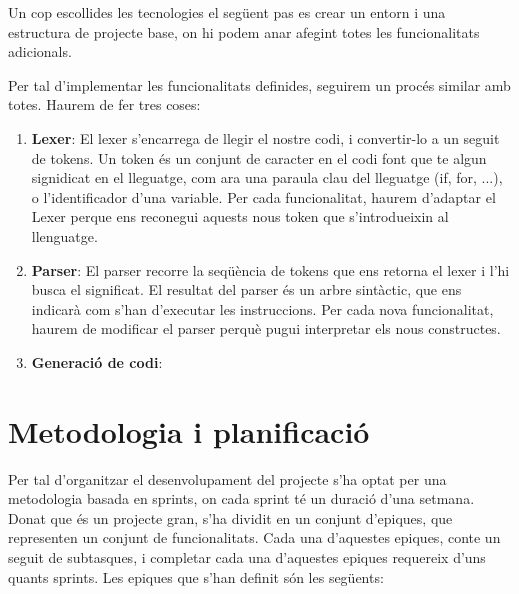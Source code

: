 ﻿\documentclass{article}
\begin{document}
Un cop escollides les tecnologies el següent pas es crear un entorn i una 
estructura de projecte base, on hi podem anar afegint totes les funcionalitats
adicionals.

Per tal d'implementar les funcionalitats definides, seguirem un procés similar
amb totes. Haurem de fer tres coses:

\begin{enumerate}
    \item \textbf{Lexer}: El lexer s'encarrega de llegir el nostre codi, i 
        convertir-lo a un seguit de tokens. Un token és un conjunt de caracter 
        en el codi font que te algun signidicat en el lleguatge, com ara una paraula 
        clau del lleguatge (if, for, ...), o l'identificador d'una variable.
        Per cada funcionalitat, haurem d'adaptar el Lexer perque ens reconegui 
        aquests nous token que s'introdueixin al llenguatge.
    \item \textbf{Parser}: El parser recorre la seqüència de tokens que ens
        retorna el lexer i l'hi busca el significat. El resultat del parser és
        un arbre sintàctic, que ens indicarà com s'han d'executar les instruccions.
        Per cada nova funcionalitat, haurem de modificar el parser perquè pugui
        interpretar els nous constructes.
    \item \textbf{Generació de codi}:
\end{enumerate}


\section{Metodologia i planificació}
Per tal d'organitzar el desenvolupament del projecte s'ha optat per una metodologia
basada en sprints, on cada sprint té un duració d'una setmana. Donat que és un 
projecte gran, s'ha dividit en un conjunt d'epiques, que representen un conjunt 
de funcionalitats. Cada una d'aquestes epiques, conte un seguit de subtasques, i
completar cada una d'aquestes epiques requereix d'uns quants sprints. Les epiques
que s'han definit són les següents:
\end{document}
